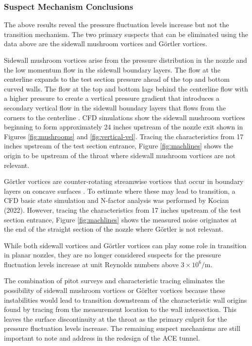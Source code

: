 \subsubsection*{Suspect Mechanism Conclusions}

The above results reveal the pressure fluctuation levels increase but not the transition mechanism. The two primary suspects that can be eliminated using the data above are the sidewall mushroom vortices and Görtler vortices.

Sidewall mushroom vortices arise from the pressure distribution in the nozzle and the low momentum flow in the sidewall boundary layers. The flow at the centerline expands to the test section pressure ahead of the top and bottom curved walls. The flow at the top and bottom lags behind the centerline flow with a higher pressure to create a vertical pressure gradient that introduces a secondary vertical flow in the sidewall boundary layers that flows from the corners to the centerline \cite{sabnis}. CFD simulations show the sidewall mushroom vortices beginning to form approximately 24 inches upstream of the nozzle exit shown in Figures \ref{fig:mushrooms} and \ref{fig:vertical-vel}. Tracing the characteristics from 17 inches upstream of the test section entrance, Figure \ref{fig:machlines} shows the origin to be upstream of the throat where sidewall mushroom vortices are not relevant.

Görtler vortices are counter-rotating streamwise vortices that occur in boundary layers on concave surfaces \cite{saric}. To estimate where these may lead to transition, a CFD basic state simulation and N-factor analysis was performed by Kocian (2022). However, tracing the characteristics from 17 inches upstream of the test section entrance, Figure \ref{fig:machlines} shows the measured noise originates at the end of the straight section of the nozzle where Görtler is not relevant.

While both sidewall vortices and Görtler vortices can play some role in transition in planar nozzles, they are no longer considered suspects for the pressure fluctuation levels increase at unit Reynolds numbers above $3 \times 10^6/\mathrm{m}$.

The combination of pitot surveys and characteristic tracing eliminates the possibility of sidewall mushroom vortices or Görlter vortices because these instabilities would lead to transition downstream of the characteristic wall origins found by tracing from the measurement location to the wall intersection. This leaves the surface discontinuity at the throat as the primary culprit for the pressure fluctuation levels increase. The remaining suspect mechanisms are still important to note and address in the redesign of the ACE tunnel.


